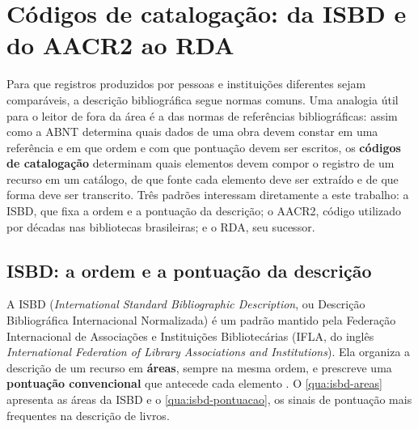 \section{Códigos de catalogação: da ISBD e do AACR2 ao RDA}
\label{sec:codigos}

Para que registros produzidos por pessoas e instituições diferentes sejam comparáveis, a descrição bibliográfica segue normas comuns. Uma analogia útil para o leitor de fora da área é a das normas de referências bibliográficas: assim como a ABNT determina quais dados de uma obra devem constar em uma referência e em que ordem e com que pontuação devem ser escritos, os \textbf{códigos de catalogação} determinam quais elementos devem compor o registro de um recurso em um catálogo, de que fonte cada elemento deve ser extraído e de que forma deve ser transcrito. Três padrões interessam diretamente a este trabalho: a ISBD, que fixa a ordem e a pontuação da descrição; o AACR2, código utilizado por décadas nas bibliotecas brasileiras; e o RDA, seu sucessor.

\subsection{ISBD: a ordem e a pontuação da descrição}
\label{subsec:isbd}

A ISBD (\textit{International Standard Bibliographic Description}, ou Descrição Bibliográfica Internacional Normalizada) é um padrão mantido pela Federação Internacional de Associações e Instituições Bibliotecárias (IFLA, do inglês \textit{International Federation of Library Associations and Institutions}). Ela organiza a descrição de um recurso em \textbf{áreas}, sempre na mesma ordem, e prescreve uma \textbf{pontuação convencional} que antecede cada elemento \cite{isbd2011}. O \autoref{qua:isbd-areas} apresenta as áreas da ISBD e o \autoref{qua:isbd-pontuacao}, os sinais de pontuação mais frequentes na descrição de livros.

